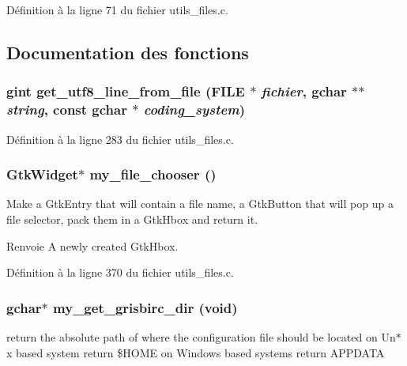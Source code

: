 Définition à la ligne 71 du fichier utils\_\-files.c.



\subsection{Documentation des fonctions}
\subsubsection[{get\_\-utf8\_\-line\_\-from\_\-file}]{\setlength{\rightskip}{0pt plus 5cm}gint get\_\-utf8\_\-line\_\-from\_\-file (FILE $\ast$ {\em fichier}, \/  gchar $\ast$$\ast$ {\em string}, \/  const gchar $\ast$ {\em coding\_\-system})}\label{utils__files_8c_a3a8b0bb721fc3468001ca2ea9e9d17a0}


Définition à la ligne 283 du fichier utils\_\-files.c.

\subsubsection[{my\_\-file\_\-chooser}]{\setlength{\rightskip}{0pt plus 5cm}GtkWidget$\ast$ my\_\-file\_\-chooser ()}\label{utils__files_8c_ad180bc31f9d0e255a0e6e1a0a05a7d82}
Make a GtkEntry that will contain a file name, a GtkButton that will pop up a file selector, pack them in a GtkHbox and return it.

\begin{DoxyReturn}{Renvoie}
A newly created GtkHbox. 
\end{DoxyReturn}


Définition à la ligne 370 du fichier utils\_\-files.c.

\subsubsection[{my\_\-get\_\-grisbirc\_\-dir}]{\setlength{\rightskip}{0pt plus 5cm}gchar$\ast$ my\_\-get\_\-grisbirc\_\-dir (void)}\label{utils__files_8c_a1a062adbff317c16f4e4930090068dd3}
return the absolute path of where the configuration file should be located on Un$\ast$x based system return \$HOME on Windows based systems return APPDATA

